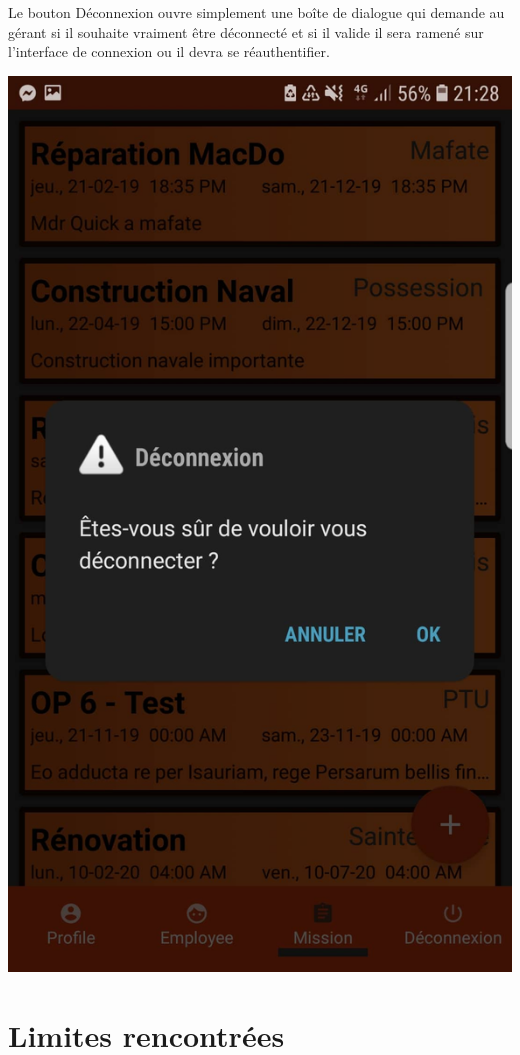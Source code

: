 \documentclass{article}
\begin{document}
Le bouton Déconnexion ouvre simplement une boîte de dialogue qui demande au gérant si il souhaite vraiment être déconnecté et si il valide il sera ramené sur l'interface de connexion ou il devra se réauthentifier.
\begin{center}
    \includegraphics[scale=0.1]{deco.jpg}
\end{center}

\newpage

\section{Limites rencontrées}
\end{document}
